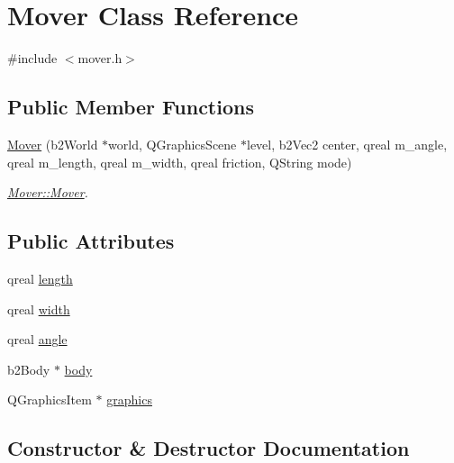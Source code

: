 \hypertarget{class_mover}{}\section{Mover Class Reference}
\label{class_mover}


{\ttfamily \#include $<$mover.\+h$>$}

\subsection*{Public Member Functions}
\begin{DoxyCompactItemize}
\item 
\hyperlink{class_mover_a8ec5e7ce87190ce9b25f1df64efa7821}{Mover} (b2\+World $\ast$world, Q\+Graphics\+Scene $\ast$level, b2\+Vec2 center, qreal m\+\_\+angle, qreal m\+\_\+length, qreal m\+\_\+width, qreal friction, Q\+String mode)
\begin{DoxyCompactList}\small\item\em \hyperlink{class_mover_a8ec5e7ce87190ce9b25f1df64efa7821}{Mover\+::\+Mover}. \end{DoxyCompactList}\end{DoxyCompactItemize}
\subsection*{Public Attributes}
\begin{DoxyCompactItemize}
\item 
qreal \hyperlink{class_mover_a2c55f3d5a807d328bcc8c73cdef5dda2}{length}
\item 
qreal \hyperlink{class_mover_ab78fbf587764d7cdcd417d2a444408d4}{width}
\item 
qreal \hyperlink{class_mover_acb7d779b2ce97a86149990dce48e88b5}{angle}
\item 
b2\+Body $\ast$ \hyperlink{class_mover_a6e91384098180f0fef918dd45f97f201}{body}
\item 
Q\+Graphics\+Item $\ast$ \hyperlink{class_mover_a111eebc06a95c11dc6f48dcc6a33478f}{graphics}
\end{DoxyCompactItemize}


\subsection{Constructor \& Destructor Documentation}
